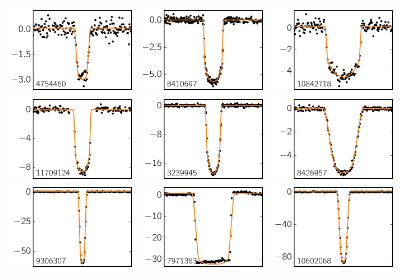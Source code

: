 \includegraphics[width=0.25\textwidth]{figures/lcs/4754460.pdf}
\includegraphics[width=0.25\textwidth]{figures/lcs/8410697.pdf}
\includegraphics[width=0.25\textwidth]{figures/lcs/10842718.pdf}
\includegraphics[width=0.25\textwidth]{figures/lcs/11709124.pdf}
\includegraphics[width=0.25\textwidth]{figures/lcs/3239945.pdf}
\includegraphics[width=0.25\textwidth]{figures/lcs/8426957.pdf}
\includegraphics[width=0.25\textwidth]{figures/lcs/9306307.pdf}
\includegraphics[width=0.25\textwidth]{figures/lcs/7971363.pdf}
\includegraphics[width=0.25\textwidth]{figures/lcs/10602068.pdf}
